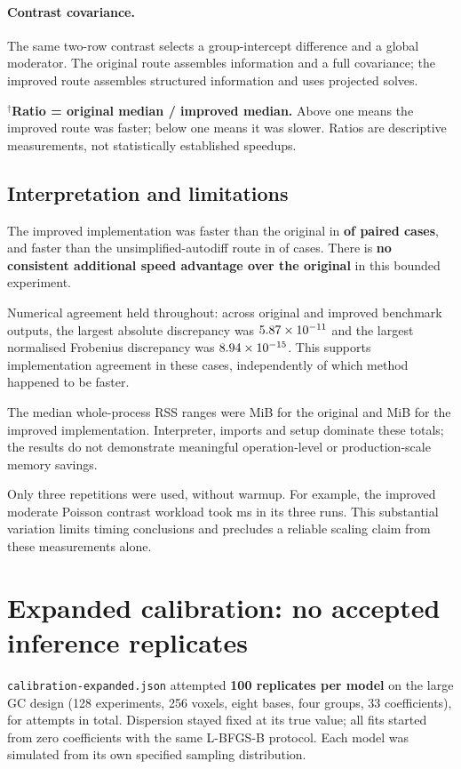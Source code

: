 \documentclass[11pt,a4paper]{article}
\begin{document}
\paragraph{Contrast covariance.}
The same two-row contrast selects a group-intercept difference and a global
moderator. The original route assembles information and a full covariance;
the improved route assembles structured information and uses projected solves.
\begin{center}\small
\ExpandedContrastTable
\end{center}
\noindent$^\dagger$\textbf{Ratio = original median / improved median.}
Above one means the improved route was faster; below one means it was slower.
Ratios are descriptive measurements, not statistically established speedups.

\subsection{Interpretation and limitations}
The improved implementation was faster than the original in
\textbf{\ExpandedFasterOriginal{} of \ExpandedPairs{} paired cases},
and faster than the unsimplified-autodiff route in
\ExpandedFasterAutodiff{} of \ExpandedPairs{} cases.
There is \textbf{no consistent additional speed advantage over the original}
in this bounded experiment.

Numerical agreement held throughout: across original and improved benchmark
outputs, the largest absolute discrepancy was $5.87\times 10^{-11}$ and the
largest normalised Frobenius discrepancy was $8.94\times 10^{-15}$.
This supports implementation agreement in these cases, independently of
which method happened to be faster.

The median whole-process RSS ranges were \ExpandedOriginalRSS{} MiB for the
original and \ExpandedImprovedRSS{} MiB for the improved implementation.
Interpreter, imports and setup dominate these totals; the results do not
demonstrate meaningful operation-level or production-scale memory savings.

Only three repetitions were used, without warmup. For example, the improved
moderate Poisson contrast workload took \ExpandedTimingSpread{} ms in its
three runs. This substantial variation limits timing conclusions and
precludes a reliable scaling claim from these measurements alone.

\clearpage
\section{Expanded calibration: no accepted inference replicates}
\texttt{calibration-expanded.json} attempted \textbf{100 replicates per model}
on the large GC design (128 experiments, 256 voxels, eight bases, four groups,
33 coefficients), for \ExpandedAttempts{} attempts in total.
Dispersion stayed fixed at its true value; all fits started from zero
coefficients with the same L-BFGS-B protocol.
Each model was simulated from its own specified sampling distribution.
\end{document}
